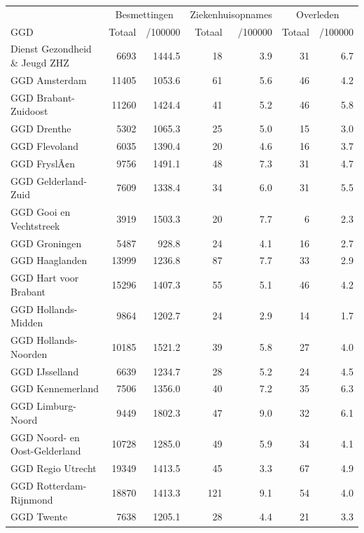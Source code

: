\documentclass[
  english,
  man,floatsintext]{apa6}
\begin{document}
\begin{table}
\centering\begingroup\fontsize{10}{12}\selectfont

\begin{threeparttable}
\begin{tabular}{lrrrrrr}
\toprule
\multicolumn{1}{c}{ } & \multicolumn{2}{c}{Besmettingen} & \multicolumn{2}{c}{Ziekenhuisopnames} & \multicolumn{2}{c}{Overleden} \\
\cmidrule(l{3pt}r{3pt}){2-3} \cmidrule(l{3pt}r{3pt}){4-5} \cmidrule(l{3pt}r{3pt}){6-7}
GGD & Totaal & /100000 & Totaal & /100000 & Totaal & /100000\\
\midrule
Dienst Gezondheid \& Jeugd ZHZ & 6693 & 1444.5 & 18 & 3.9 & 31 & 6.7\\
GGD Amsterdam & 11405 & 1053.6 & 61 & 5.6 & 46 & 4.2\\
GGD Brabant-Zuidoost & 11260 & 1424.4 & 41 & 5.2 & 46 & 5.8\\
GGD Drenthe & 5302 & 1065.3 & 25 & 5.0 & 15 & 3.0\\
GGD Flevoland & 6035 & 1390.4 & 20 & 4.6 & 16 & 3.7\\
GGD FryslÃ¢n & 9756 & 1491.1 & 48 & 7.3 & 31 & 4.7\\
GGD Gelderland-Zuid & 7609 & 1338.4 & 34 & 6.0 & 31 & 5.5\\
GGD Gooi en Vechtstreek & 3919 & 1503.3 & 20 & 7.7 & 6 & 2.3\\
GGD Groningen & 5487 & 928.8 & 24 & 4.1 & 16 & 2.7\\
GGD Haaglanden & 13999 & 1236.8 & 87 & 7.7 & 33 & 2.9\\
GGD Hart voor Brabant & 15296 & 1407.3 & 55 & 5.1 & 46 & 4.2\\
GGD Hollands-Midden & 9864 & 1202.7 & 24 & 2.9 & 14 & 1.7\\
GGD Hollands-Noorden & 10185 & 1521.2 & 39 & 5.8 & 27 & 4.0\\
GGD IJsselland & 6639 & 1234.7 & 28 & 5.2 & 24 & 4.5\\
GGD Kennemerland & 7506 & 1356.0 & 40 & 7.2 & 35 & 6.3\\
GGD Limburg-Noord & 9449 & 1802.3 & 47 & 9.0 & 32 & 6.1\\
GGD Noord- en Oost-Gelderland & 10728 & 1285.0 & 49 & 5.9 & 34 & 4.1\\
GGD Regio Utrecht & 19349 & 1413.5 & 45 & 3.3 & 67 & 4.9\\
GGD Rotterdam-Rijnmond & 18870 & 1413.3 & 121 & 9.1 & 54 & 4.0\\
GGD Twente & 7638 & 1205.1 & 28 & 4.4 & 21 & 3.3\\

\end{tabular}
\end{threeparttable}
\end{table}
\end{document}
